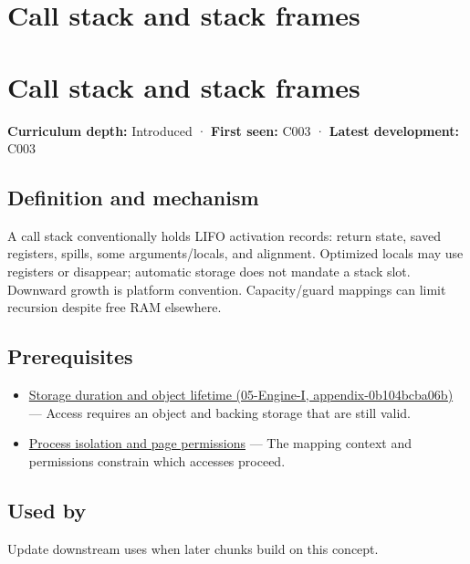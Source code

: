 \hypertarget{appendix-b081b7abe193}{}
\section*{Call stack and stack frames}
\section{Call stack and stack frames}\label{appendix-b081b7abe193-call-stack-and-stack-frames}

\textbf{Curriculum depth:} Introduced · \textbf{First seen:} C003 · \textbf{Latest development:} C003

\subsection{Definition and mechanism}\label{appendix-b081b7abe193-definition-and-mechanism}

A call stack conventionally holds LIFO activation records: return state, saved registers, spills, some arguments/locals, and alignment. Optimized locals may use registers or disappear; automatic storage does not mandate a stack slot. Downward growth is platform convention. Capacity/guard mappings can limit recursion despite free RAM elsewhere.

\subsection{Prerequisites}\label{appendix-b081b7abe193-prerequisites}

\begin{itemize}
\tightlist
\item
  \href{../05-Engine-I/main.pdf\#nameddest=appendix-0b104bcba06b}{Storage duration and object lifetime (05-Engine-I, appendix-0b104bcba06b)} --- Access requires an object and backing storage that are still valid.
\item
  \hyperref[appendix-c2a9ad1e2b49]{Process isolation and page permissions} --- The mapping context and permissions constrain which accesses proceed.
\end{itemize}

\subsection{Used by}\label{appendix-b081b7abe193-used-by}

Update downstream uses when later chunks build on this concept.

